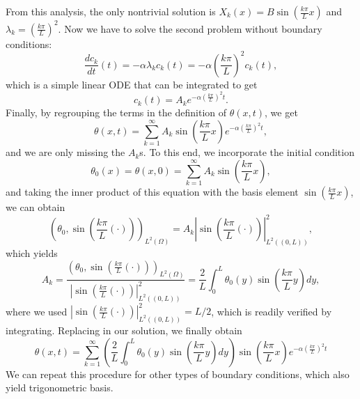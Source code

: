 From this analysis, the only nontrivial solution is $X_k(x) = B\sin\left(\frac{k\pi}{L}x\right)$ and $\lambda_k = \left(\frac{k\pi}{L}\right)^2$. Now we have to solve the second problem without boundary conditions: 
\begin{equation}
    \frac{dc_k}{dt}(t) = -\alpha\lambda_k c_k(t) = -\alpha\left(\frac{k\pi}{L}\right)^2 c_k(t),
\end{equation}
which is a simple linear ODE that can be integrated to get 
\begin{equation}
    c_k(t) = A_k e^{-\alpha\left(\frac{k\pi}{L}\right)^2 t}.
\end{equation}
Finally, by regrouping the terms in the definition of $\theta(x,t)$, we get 
\begin{equation}
    \theta(x,t) = \sum_{k=1}^\infty A_k\sin\left(\frac{k\pi}{L}x\right) e^{-\alpha\left(\frac{k\pi}{L}\right)^2 t},
\end{equation}
and we are only missing the $A_k$s. To this end, we incorporate the initial condition 
\begin{equation}
    \theta_0(x) = \theta(x,0) = \sum_{k=1}^\infty A_k\sin\left(\frac{k\pi}{L}x\right),
\end{equation}
and taking the inner product of this equation with the basis element $\sin\left(\frac{k\pi}{L}x\right)$, we can obtain 
\begin{equation}
    \left(\theta_0, \sin\left(\frac{k\pi}{L}(\cdot)\right)\right)_{L^2(\Omega)} = A_k\left|\sin\left(\frac{k\pi}{L}(\cdot)\right)\right|^2_{L^2((0,L))},
\end{equation}
which yields
\begin{equation}
    A_k = \frac{\left(\theta_0, \sin\left(\frac{k\pi}{L}(\cdot)\right)\right)_{L^2(\Omega)}}{\left|\sin\left(\frac{k\pi}{L}(\cdot)\right)\right|^2_{L^2((0,L))}} = \frac{2}{L}\int_0^L \theta_0(y)\sin\left(\frac{k\pi}{L}y\right)dy,
\end{equation}
where we used $\left|\sin\left(\frac{k\pi}{L}(\cdot)\right)\right|^2_{L^2((0,L))} = L/2$, which is readily verified by integrating. Replacing in our solution, we finally obtain 
\begin{equation}
    \theta(x,t) = \sum_{k=1}^\infty \left(\frac{2}{L}\int_0^L \theta_0(y)\sin\left(\frac{k\pi}{L}y\right)dy\right)\sin\left(\frac{k\pi}{L}x\right) e^{-\alpha\left(\frac{k\pi}{L}\right)^2 t}
\end{equation}
We can repeat this procedure for other types of boundary conditions, which also yield trigonometric basis.
